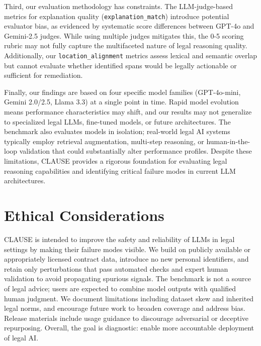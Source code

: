 \documentclass[11pt]{article}
\newcommand{\datasetName}{{\sc CLAUSE}\xspace}
\begin{document}
Third, our evaluation methodology has constraints. The LLM-judge-based metrics for explanation quality (\texttt{explanation\_match}) introduce potential evaluator bias, as evidenced by systematic score differences between GPT-4o and Gemini-2.5 judges. While using multiple judges mitigates this, the 0-5 scoring rubric may not fully capture the multifaceted nature of legal reasoning quality. Additionally, our \texttt{location\_alignment} metrics assess lexical and semantic overlap but cannot evaluate whether identified spans would be legally actionable or sufficient for remediation.

Finally, our findings are based on four specific model families (GPT-4o-mini, Gemini 2.0/2.5, Llama 3.3) at a single point in time. Rapid model evolution means performance characteristics may shift, and our results may not generalize to specialized legal LLMs, fine-tuned models, or future architectures. The benchmark also evaluates models in isolation; real-world legal AI systems typically employ retrieval augmentation, multi-step reasoning, or human-in-the-loop validation that could substantially alter performance profiles. Despite these limitations, \datasetName provides a rigorous foundation for evaluating legal reasoning capabilities and identifying critical failure modes in current LLM architectures.

\section*{Ethical Considerations}

\datasetName is intended to improve the safety and reliability of LLMs in legal settings by making their failure modes visible. We build on publicly available or appropriately licensed contract data, introduce no new personal identifiers, and retain only perturbations that pass automated checks and expert human validation to avoid propagating spurious signals. The benchmark is not a source of legal advice; users are expected to combine model outputs with qualified human judgment. We document limitations including dataset skew and inherited legal norms, and encourage future work to broaden coverage and address bias. Release materials include usage guidance to discourage adversarial or deceptive repurposing. Overall, the goal is diagnostic: enable more accountable deployment of legal AI. 






\appendix
\end{document}
